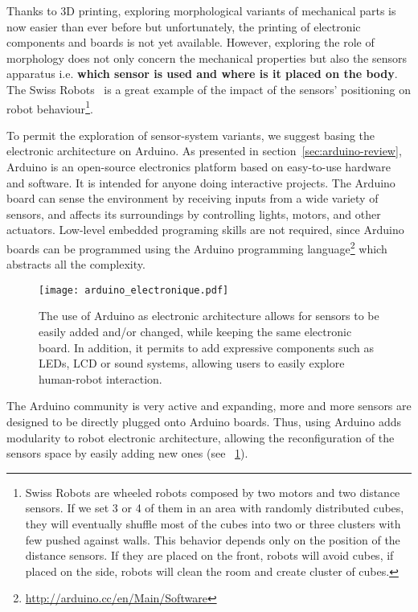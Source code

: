 Thanks to 3D printing, exploring morphological variants of mechanical parts is now easier than ever before but unfortunately, the printing of electronic components and boards is not yet available. However, exploring the role of morphology does not only concern the mechanical properties but also the sensors apparatus i.e. \textbf{which sensor is used and where is it placed on the body}. The Swiss Robots~\parencite{maris1996exploiting} is a great example of the impact of the sensors’ positioning on robot behaviour\footnote{Swiss Robots are wheeled robots composed by two motors and two distance sensors. If we set 3 or 4 of them in an area with randomly distributed cubes, they will eventually shuffle most of the cubes into two or three clusters with few pushed against walls. This behavior depends only on the position of the distance sensors. If they are placed on the front, robots will avoid cubes, if placed on the side, robots will clean the room and create cluster of cubes.}.

To permit the exploration of sensor-system variants, we suggest basing the electronic architecture on Arduino. As presented in section~\ref{sec:arduino-review}, Arduino is an open-source electronics platform based on easy-to-use hardware and software. It is intended for anyone doing interactive projects. The Arduino board can sense the environment by receiving inputs from a wide variety of sensors, and affects its surroundings by controlling lights, motors, and other actuators. Low-level embedded programing skills are not required, since Arduino boards can be programmed using the Arduino programming language\footnote{\url{http://arduino.cc/en/Main/Software}} which abstracts all the complexity.

\begin{figure}[tb]
    \begin{center}
        \texttt{[image: arduino\_electronique.pdf]}
    \end{center}
    \caption{The use of Arduino as electronic architecture  allows for sensors to be easily added and/or changed, while keeping the same electronic board. In addition, it permits to add expressive components such as LEDs, LCD or sound systems, allowing users to easily explore human-robot interaction.}
    \label{fig:arduino_modular_electronic}
\end{figure}


The Arduino community is very active and expanding, more and more sensors are designed to be directly plugged onto Arduino boards. Thus, using Arduino adds modularity to robot electronic architecture, allowing the reconfiguration of the sensors space by easily adding new ones (see \figurename~\ref{fig:arduino_modular_electronic}).


